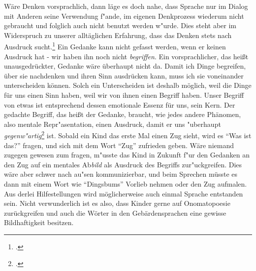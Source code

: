 \documentclass[a4paper, 12pt]{article}
\begin{document}
\begin{onehalfspace}
Wäre Denken vorsprachlich, dann läge es doch nahe, dass Sprache nur im Dialog mit Anderen seine Verwendung f"ande, im eigenen Denkprozess wiederum nicht gebraucht und folglich auch nicht benutzt werden w"urde. Dies steht aber im Widerspruch zu unserer alltäglichen Erfahrung, dass das Denken stets nach Ausdruck sucht.\footnote{\Cite[Vgl.][S. 216]{merleau1966phanomenologie}.} Ein Gedanke kann nicht gefasst werden, wenn er keinen Ausdruck hat - wir haben ihn noch nicht \emph{begriffen}. Ein vorsprachlicher, das heißt unausgedrückter, Gedanke wäre überhaupt nicht da. Damit ich Dinge begreifen, über sie nachdenken und ihren Sinn ausdrücken kann, muss ich sie voneinander unterscheiden können. Solch ein Unterscheiden ist deshalb möglich, weil die Dinge für uns einen Sinn haben, weil wir von ihnen einen Begriff haben. Unser Begriff von etwas ist entsprechend dessen emotionale Essenz für uns, sein Kern. Der gedachte Begriff, das heißt der Gedanke, braucht, wie jedes andere Phänomen, also mentale Repr"asentation, einen Ausdruck, damit er uns "uberhaupt \emph{gegenw"artig}\footnote{\cite[Vgl.][S. 215 f.]{merleau1966phanomenologie}.} ist. Sobald ein Kind das erste Mal einen Zug sieht, wird es "`Was ist das?"' fragen, und sich mit dem Wort "`Zug"' zufrieden geben. Wäre niemand zugegen gewesen zum fragen, m"usste das Kind in Zukunft f"ur den Gedanken an den Zug auf ein mentales Ab\emph{bild} als Ausdruck des Begriffs zur"uckgreifen. Dies wäre aber schwer nach au"sen kommunizierbar, und beim Sprechen müsste es dann mit einem Wort wie "`Dingsbums"' Vorlieb nehmen oder den Zug aufmalen. Aus derlei Hilfestellungen wird möglicherweise auch einmal Sprache entstanden sein. Nicht verwunderlich ist es also, dass Kinder gerne auf Onomatopoesie zurückgreifen und auch die Wörter in den Gebärdensprachen eine gewisse Bildhaftigkeit besitzen. 


\end{onehalfspace}
\end{document}
